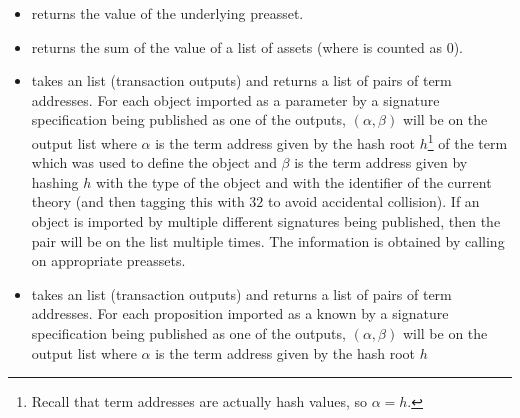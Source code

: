 \begin{itemize}
and the preasset is a currency preasset with $v$ cants, then the value is $v$ cants.
Currency assets from the initial distribution (with birthday $0$) are treated in a special manner.
In particular, their value will halve along with the block rewards.
Suppose the birthday is $0$ and the preasset is a currency asset with $v$ cants.
Until block height $280,000$, the preasset is worth $v$ cants.
Block height $280,000$ is when the second reward halving occurs and should
occur roughly 5 years after the network begins running.
For the next $210,000$ blocks after block height $280,000$ the value
is divided in half (rounding down).
The value continues to be divided in half each $210,000$ blocks from that point on
until block height $11,410,000$ at which point all currency preassets with birthday $0$
have value $0$ cants.
Block height $11,410,000$ should occur after roughly 200 years.\footnote{The code for halving the value of the unclaimed initial distribution was added by Trent Russell in early 2016, at his suggestion.}
\item {} returns the value of the underlying preasset.
\item {} returns the sum of the value of a list of assets (where {} is counted as $0$).
\item {} takes
an {} list (transaction outputs)
and returns a list of pairs of term addresses.
For each object imported as a parameter by a signature specification being published as one of the outputs,
$(\alpha,\beta)$ will be on the output list
where $\alpha$ is the term address given by the hash root $h$\footnote{Recall that term addresses are actually hash values, so $\alpha = h$.}
of the term which was used to define the object
and $\beta$ is the term address given by hashing $h$ with the type of the object and with the identifier of the current theory
(and then tagging this with $32$ to avoid accidental collision).
If an object is imported by multiple
different signatures being published, then the pair will be on the list multiple times.
The information is obtained by calling {} on appropriate preassets.
\item {} takes
an {} list (transaction outputs)
and returns a list of pairs of term addresses.
For each proposition imported as a known by a signature specification being published as one of the outputs,
$(\alpha,\beta)$ will be on the output list
where $\alpha$ is the term address given by the hash root $h$

\end{itemize}
